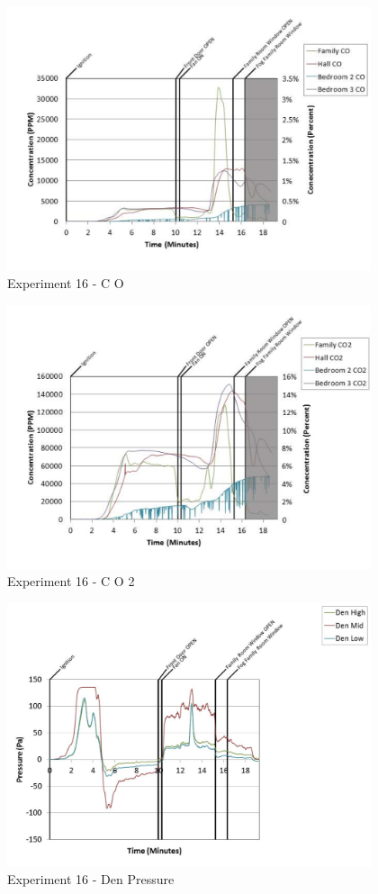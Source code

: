 \documentclass{article}
\begin{document}
\begin{appendices}
	\clearpage

	\begin{figure}[h!]
		\centering
		\includegraphics[height=3.05in]{0_Images/Results_Charts/Exp_16_Charts/CO.pdf}
		\caption{Experiment 16 - C O}
	\end{figure}
 

	\begin{figure}[h!]
		\centering
		\includegraphics[height=3.05in]{0_Images/Results_Charts/Exp_16_Charts/CO2.pdf}
		\caption{Experiment 16 - C O 2}
	\end{figure}
 
	\clearpage

	\begin{figure}[h!]
		\centering
		\includegraphics[height=3.05in]{0_Images/Results_Charts/Exp_16_Charts/DenPressure.pdf}
		\caption{Experiment 16 - Den Pressure}
	\end{figure}
 


\end{appendices}
\end{document}
